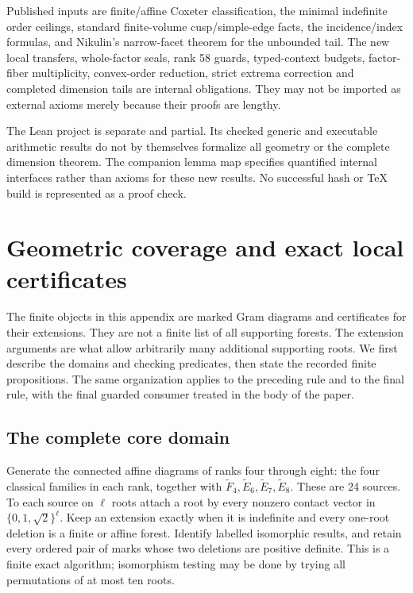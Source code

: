 \documentclass[11pt]{article}
\theoremstyle{remark}\newtheorem{remark}[theorem]{Remark}
\begin{document}
Published inputs are finite/affine Coxeter classification, the minimal
indefinite order ceilings, standard finite-volume cusp/simple-edge facts,
the incidence/index formulas, and Nikulin's narrow-facet theorem for the
unbounded tail. The new local transfers, whole-factor
seals, rank 58 guards, typed-context budgets, factor-fiber multiplicity,
convex-order reduction, strict extrema correction and completed dimension
tails are internal obligations. They may not be imported as external
axioms merely because their proofs are lengthy.

The Lean project is separate and partial. Its checked generic and
executable arithmetic results do not by themselves formalize all geometry
or the complete dimension theorem. The companion lemma map specifies
quantified internal interfaces rather than axioms for these new results.
No successful hash or TeX build is represented as a proof check.

\appendix
\section{Geometric coverage and exact local certificates}
\label{app:routing}

The finite objects in this appendix are marked Gram diagrams and
certificates for their extensions. They are not a finite list of all
supporting forests. The extension arguments are what allow arbitrarily
many additional supporting roots. We first describe the domains and
checking predicates, then state the recorded finite propositions.
The same organization applies to the preceding rule and to the final
rule, with the final guarded consumer treated in the body of the paper.

\subsection{The complete core domain}

Generate the connected affine diagrams of ranks four through eight:
the four classical families in each rank, together with
$\widetilde F_4,\widetilde E_6,\widetilde E_7,\widetilde E_8$.
These are 24 sources. To each source on $\ell$ roots attach a root
by every nonzero contact vector in $\{0,1,\sqrt2\}^{\ell}$.
Keep an extension exactly when it is indefinite and every one-root
deletion is a finite or affine forest. Identify labelled isomorphic
results, and retain every ordered pair of marks whose two deletions
are positive definite. This is a finite exact algorithm; isomorphism
testing may be done by trying all permutations of at most ten roots.
\end{document}
